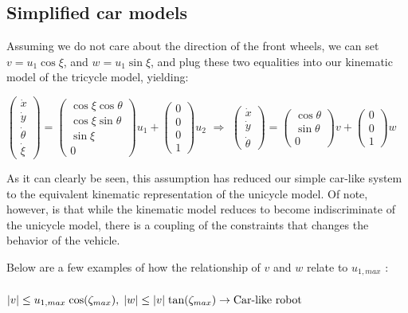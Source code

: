 \documentclass[twoside]{article}
\begin{document}
\subsection*{Simplified car models}

Assuming we do not care about the direction of the front wheels, we can set $v = u_1 \cos \xi$, and $w = u_1 \sin \xi$, and plug these two equalities into our kinematic model of the tricycle model, yielding:

\begin{center}
$
\begin{pmatrix}
\dot{x} \\ \dot{y} \\ \dot{\theta} \\ \dot{\xi}
\end{pmatrix} =
\begin{pmatrix} \cos \xi \cos \theta \\ \cos \xi \sin \theta \\ \sin \xi \\ 0 \end{pmatrix} u_1 + \begin{pmatrix} 0 \\ 0 \\ 0 \\ 1 \end{pmatrix} u_2
$ $\Rightarrow$ $
\begin{pmatrix}
\dot{x} \\ \dot{y} \\ \dot{\theta}
\end{pmatrix} =
\begin{pmatrix} \cos \theta \\ \sin \theta \\ 0 \end{pmatrix} v + \begin{pmatrix} 0 \\ 0 \\ 1 \end{pmatrix} w
$
\end{center}

As it can clearly be seen, this assumption has reduced our simple car-like system to the equivalent kinematic representation of the unicycle model. Of note, however, is that while the kinematic model reduces to become indiscriminate of the unicycle model, there is a coupling of the constraints that changes the behavior of the vehicle.

Below are a few examples of how the relationship of $v$ and $w$ relate to $u_{1,max}$ \cite{jp}:
\\\\
$
|v| \leq u_{1,max}\;\textup{cos}(\zeta_{max}),\;|w|\leq |v|\;\textup{tan}(\zeta_{max}) \rightarrow \textup{Car-like robot}
$
\end{document}
